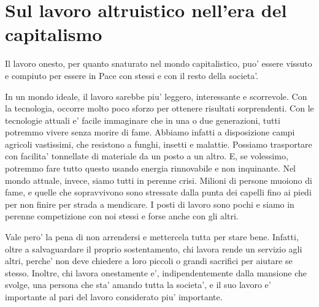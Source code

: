 \chapter{Sul lavoro altruistico nell'era del capitalismo}
\label{altruismoLavoro}

Il lavoro onesto, per quanto snaturato nel mondo capitalistico, puo' essere vissuto e compiuto per essere in Pace con stessi e con il resto della societa'. 

In un mondo ideale, il lavoro sarebbe piu' leggero, interessante e scorrevole. Con la tecnologia, occorre molto poco sforzo per ottenere risultati sorprendenti. Con le tecnologie attuali e' facile immaginare che in una o due generazioni, tutti potremmo vivere senza morire di fame. Abbiamo infatti a disposizione campi agricoli vastissimi, che resistono a funghi, insetti e malattie. Possiamo trasportare con facilita' tonnellate di materiale da un posto a un altro. E, se volessimo, potremmo fare tutto questo usando energia rinnovabile e non inquinante. Nel mondo attuale, invece, siamo tutti in perenne crisi. Milioni di persone muoiono di fame, e quelle che sopravvivono sono stressate dalla punta dei capelli fino ai piedi per non finire per strada a mendicare. I posti di lavoro sono pochi e siamo in perenne competizione con noi stessi e forse anche con gli altri.

Vale pero' la pena di non arrendersi e mettercela tutta per stare bene. Infatti, oltre a salvaguardare il proprio sostentamento, chi lavora rende un servizio agli altri, perche' non deve chiedere a loro piccoli o grandi sacrifici per aiutare se stesso. Inoltre, chi lavora onestamente e', indipendentemente dalla mansione che svolge, una persona che sta' amando tutta la societa', e il suo lavoro e' importante al pari del lavoro considerato piu' importante.


